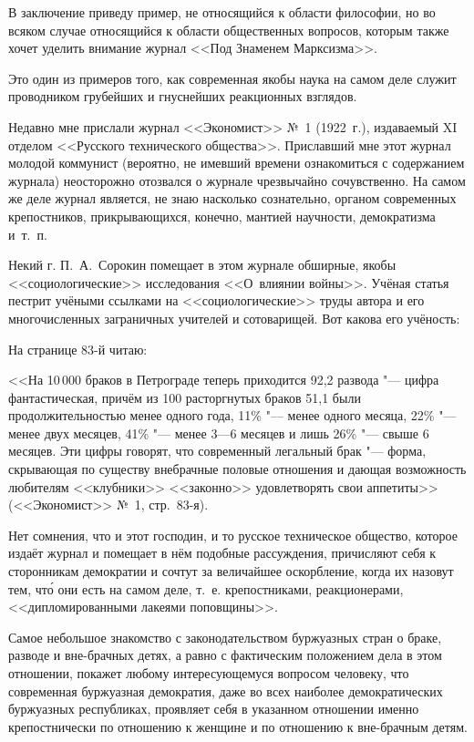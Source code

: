 В заключение приведу пример, не относящийся к области философии, но во
всяком случае относящийся к области общественных вопросов, которым также
хочет уделить внимание журнал <<Под Знаменем Марксизма>>.

Это один из примеров того, как современная якобы наука на самом деле служит
проводником грубейших и гнуснейших реакционных взглядов.

Недавно мне прислали журнал <<Экономист>> №~1 (1922~г.),
издаваемый XI отделом <<Русского технического общества>>. Приславший мне этот
журнал молодой коммунист (вероятно, не имевший времени ознакомиться с
содержанием журнала) неосторожно отозвался о журнале чрезвычайно
сочувственно. На самом же деле журнал является, не знаю насколько
сознательно, органом современных крепостников, прикрывающихся, конечно,
мантией научности, демократизма и~т.~п.

Некий г. П.~А.~Сорокин помещает в этом
журнале обширные, якобы <<социологические>> исследования <<О~влиянии войны>>.
Учёная статья пестрит учёными ссылками на <<социологические>> труды автора и
его многочисленных заграничных учителей и сотоварищей. Вот какова его
учёность:

На странице 83-й читаю:

\medskip
{\small
<<На 10\,000 браков в Петрограде теперь приходится 92,2 развода "--- цифра
фантастическая, причём из 100 расторгнутых браков 51,1 были
продолжительностью менее одного года, 11\% "--- менее одного месяца, 22\% "--- менее
двух месяцев, 41\% "--- менее 3---6 месяцев и лишь 26\% "--- свыше 6 месяцев.
Эти цифры говорят, что современный легальный брак "--- форма, скрывающая по
существу внебрачные половые отношения и дающая возможность любителям
<<клубники>> <<законно>> удовлетворять свои аппетиты>> (<<Экономист>>
№~1, стр.~83-я).}
\medskip

Нет сомнения, что и этот господин, и то русское техническое общество,
которое издаёт журнал и помещает в нём подобные рассуждения, причисляют
себя к сторонникам демократии и сочтут за величайшее оскорбление, когда их
назовут тем, чт\'{о} они есть на самом деле, т.~е. крепостниками,
реакционерами, <<дипломированными лакеями поповщины>>.

Самое небольшое знакомство с законодательством буржуазных стран о браке,
разводе и вне-брачных детях, а равно с фактическим положением дела в этом
отношении, покажет любому интересующемуся вопросом человеку, что
современная буржуазная демократия, даже во всех наиболее демократических
буржуазных республиках, проявляет себя в указанном отношении именно
крепостнически по отношению к женщине и по отношению к вне-брачным детям.

